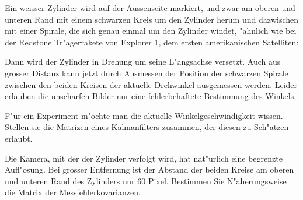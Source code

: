 Ein weisser Zylinder wird auf der Aussenseite markiert, und zwar
am oberen und unteren Rand mit einem schwarzen Kreis um den Zylinder
herum und dazwischen mit einer Spirale, die sich genau einmal
um den Zylinder windet, "ahnlich wie bei der Redstone Tr"agerrakete von
Explorer 1, dem ersten amerikanischen Satelliten:
\begin{center}
\end{center}
Dann wird der Zylinder in Drehung um seine L"angsachse versetzt.
Auch aus grosser Distanz kann jetzt durch Ausmessen der Position
der schwarzen Spirale zwischen den beiden Kreisen der aktuelle Drehwinkel
ausgemessen werden. Leider erlauben die unscharfen Bilder nur
eine fehlerbehaftete Bestimmung des Winkels.
\begin{teilaufgaben}
\item
F"ur ein Experiment
m"ochte man die aktuelle Winkelgeschwindigkeit wissen.
Stellen sie die Matrizen eines Kalmanfilters zusammen, der
diesen zu Sch"atzen erlaubt.
\item
Die Kamera, mit der der Zylinder verfolgt wird, hat nat"urlich eine
begrenzte Aufl"osung. Bei grosser Entfernung ist der Abstand der
beiden Kreise am oberen und unteren Rand des Zylinders nur 60 Pixel.
Bestimmen Sie N"aherungsweise die Matrix der Messfehlerkovarianzen.
\end{teilaufgaben}

